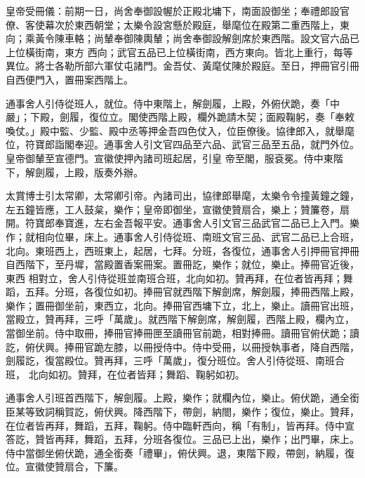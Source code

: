 
\begin{pinyinscope}

 皇帝受冊儀：前期一日，尚舍奉御設幄於正殿北墉下，南面設御坐；奉禮郎設官僚、客使幕次於東西朝堂；太樂令設宮懸於殿庭，舉麾位在殿第二重西階上，東向；乘黃令陳車輅；尚輦奉御陳輿輦；尚舍奉御設解劍席於東西階。設文官六品已上位橫街南，東方
 西向；武官五品已上位橫街南，西方東向。皆北上重行，每等異位。將士各勒所部六軍仗屯諸門。金吾仗、黃麾仗陳於殿庭。至日，押冊官引冊自西便門入，置冊案西階上。



 通事舍人引侍從班人，就位。侍中東階上，解劍履，上殿，外俯伏跪，奏「中嚴」；下殿，劍履，復位立。閣使西階上殿，欄外跪請木契；面殿鞠躬，奏「奉敕喚仗。」殿中監、少監、殿中丞等押金吾四色仗入，位臣僚後。協律郎入，就舉麾位，符寶郎詣閣奉迎。通事舍人引文官四品至六品、武官三品至五品，就門外位。皇帝御輦至宣德門。宣徽使押內諸司班起居，引皇
 帝至閣，服袞冕。侍中東階下，解劍履，上殿，版奏外辦。



 太賞博士引太常卿，太常卿引帝。內諸司出，協律郎舉麾，太樂令令撞黃鐘之鐘，左五鐘皆應，工人鼓枲，樂作；皇帝即御坐，宣徽使贊扇合，樂上；贊簾卷，扇開。符寶郎奉寶進，左右金吾報平安。通事舍人引文官三品武官二品已上入門。樂作；就相向位畢，床上。通事舍人引侍從班、南班文官三品、武官二品已上合班，北向。東班西上，西班東上，起居，七拜。分班，各復位，通事舍人引押冊官押冊自西階下，至丹墀，當殿置香案冊案。置冊訖，樂作；就位，樂止。捧冊官近後，東西
 相對立，舍人引侍從班並南班合班，北向如初。贊再拜，在位者皆再拜；舞蹈，五拜。分班，各復位如初。捧冊官就西階下解劍席，解劍履，捧冊西階上殿，樂作；置冊御坐前，東西立，北向。捧冊官西墉下立，北上，樂止。讀冊官出班，當殿立，贊再拜，三呼「萬歲」。就西階下解劍席，解劍履，西階上殿，欄內立，當御坐前。侍中取冊，捧冊官捧冊匣至讀冊官前跪，相對捧冊。讀冊官俯伏跪；讀訖，俯伏興。捧冊官跪左膝，以冊授侍中。侍中受冊，以冊授執事者，降自西階，劍履訖，復當殿位。贊再拜，三呼「萬歲」，復分班位。舍人引侍從班、南班合班，
 北向如初。贊拜，在位者皆拜；舞蹈、鞠躬如初。



 通事舍人引班首西階下，解劍履。上殿，樂作；就欄內位，樂止。俯伏跪，通全銜臣某等致詞稱賀訖，俯伏興。降西階下，帶劍，納閤，樂作；復位，樂止。贊拜，在位者皆再拜，舞蹈，五拜，鞠躬。侍中臨軒西向，稱「有制」，皆再拜。侍中宣答訖，贊皆再拜，舞蹈，五拜，分班各復位。三品已上出，樂作；出門畢，床上。侍中當御坐俯伏跪，通全銜奏「禮畢」，俯伏興。退，東階下殿，帶劍，納履，復位。宣徽使贊扇合，下簾。




\end{pinyinscope}
